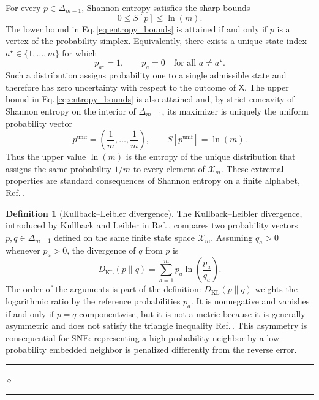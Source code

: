 \documentclass[11pt,a4paper]{article}
\newcommand{\KL}{D_{\mathrm{KL}}}
\theoremstyle{definition}
\newtheorem{definition}{Definition}[section]
\theoremstyle{plain}
\newcommand{\definitionseparator}{%
    \par\nobreak\vspace{0.15em}%
    \noindent\hfill
    \rule{0.19\linewidth}{0.30pt}%
    \hspace{0.65em}%
    {\scriptsize$\diamond$}%
    \hspace{0.65em}%
    \rule{0.19\linewidth}{0.30pt}%
    \hfill\mbox{}%
    \par\vspace{0.35em}%
}
\begin{document}
For every \(p\in\Delta_{m-1}\), Shannon entropy satisfies the sharp bounds
\begin{equation}
    0\le S[p]\le\ln\left(m\right).
    \label{eq:entropy_bounds}
\end{equation}
The lower bound in Eq.\,\eqref{eq:entropy_bounds} is attained if and only if \(p\) is a vertex of the probability simplex. Equivalently, there exists a unique state index \(a^\star\in\{1,\ldots,m\}\) for which
\begin{equation}
    p_{a^\star}=1,
    \qquad
    p_a=0
    \quad\text{for all }a\neq a^\star.
    \label{eq:entropy_minimizer}
\end{equation}
Such a distribution assigns probability one to a single admissible state and therefore has zero uncertainty with respect to the outcome of \(\mathsf{X}\). The upper bound in Eq.\,\eqref{eq:entropy_bounds} is also attained and, by strict concavity of Shannon entropy on the interior of \(\Delta_{m-1}\), its maximizer is uniquely the uniform probability vector
\begin{equation}
    p^{\mathrm{unif}}
    =\left(\frac{1}{m},\ldots,\frac{1}{m}\right),
    \qquad
    S\!\left[p^{\mathrm{unif}}\right]=\ln\left(m\right).
    \label{eq:entropy_maximizer}
\end{equation}
Thus the upper value \(\ln\left(m\right)\) is the entropy of the unique distribution that assigns the same probability \(1/m\) to every element of \(\mathcal{X}_m\). These extremal properties are standard consequences of Shannon entropy on a finite alphabet, Ref.\,\cite{shannon1948,cover2006}.

\begin{definition}[Kullback--Leibler divergence]
\label{def:kl}
The Kullback--Leibler divergence, introduced by Kullback and Leibler in Ref.\,\cite{kullback1951}, compares two probability vectors $p,q\in\Delta_{m-1}$ defined on the same finite state space $\mathcal{X}_m$. Assuming $q_a>0$ whenever $p_a>0$, the divergence of $q$ from $p$ is
\begin{equation}
    \KL(p\|q)
    =\sum_{a=1}^{m}p_a\ln\left(\frac{p_a}{q_a}\right).
    \label{eq:kl_definition}
\end{equation}
The order of the arguments is part of the definition: $\KL(p\|q)$ weights the logarithmic ratio by the reference probabilities $p_a$. It is nonnegative and vanishes if and only if $p=q$ componentwise, but it is not a metric because it is generally asymmetric and does not satisfy the triangle inequality Ref.\,\cite{kullback1951,cover2006}. This asymmetry is consequential for SNE: representing a high-probability neighbor by a low-probability embedded neighbor is penalized differently from the reverse error.
\end{definition}
\definitionseparator
\end{document}
